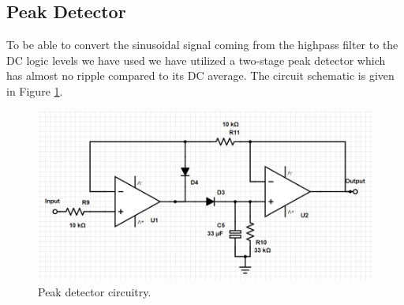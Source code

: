\documentclass[a4paper,10pt]{IEEEtran}
\begin{document}
\subsection{Peak Detector}
To be able to convert the sinusoidal signal coming from the highpass filter to the DC logic levels we have used we have utilized a two-stage peak detector which has almost no ripple compared to its DC average. The circuit schematic is given in Figure \ref{peak}.
\begin{figure}[htbp!]
    \centering
    \includegraphics[width = 1\linewidth]{Peak Detector.jpg}
    \caption{Peak detector circuitry.}
    \label{peak}
\end{figure} 
\end{document}
